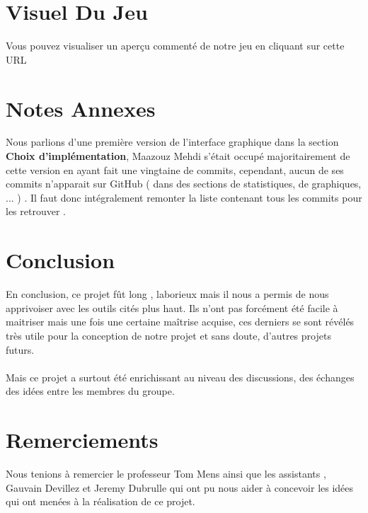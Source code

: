 \documentclass[a4paper,10pt]{article}
\begin{document}
\section{Visuel Du Jeu}
Vous pouvez visualiser un aperçu commenté de notre jeu en cliquant sur cette URL

\section{Notes Annexes}
Nous parlions d'une première version de l'interface graphique dans la section \textbf{Choix d'implémentation}, Maazouz Mehdi s'était occupé majoritairement
de cette version en ayant fait une vingtaine de commits, cependant, aucun de ses commits n'apparait sur GitHub ( dans des sections de statistiques, 
de graphiques, ... ) . Il faut donc intégralement remonter la liste contenant tous les commits pour les retrouver .
\section{Conclusion}
En conclusion, ce projet fût long , laborieux mais il nous a permis de nous apprivoiser avec les outils cités plus haut. Ils n'ont pas
forcément été facile à maitriser mais une fois une certaine maîtrise acquise, ces derniers se sont révélés très utile pour la conception de 
notre projet et sans doute, d'autres projets futurs. 
\\
\\
Mais ce projet a surtout été enrichissant au niveau des discussions, des échanges des idées entre les membres du groupe.

\section{Remerciements}
Nous tenions à remercier le professeur Tom Mens ainsi que les assistants , Gauvain Devillez et Jeremy Dubrulle qui ont pu nous aider à concevoir les idées qui ont menées 
à la réalisation de ce projet.
\end{document}
